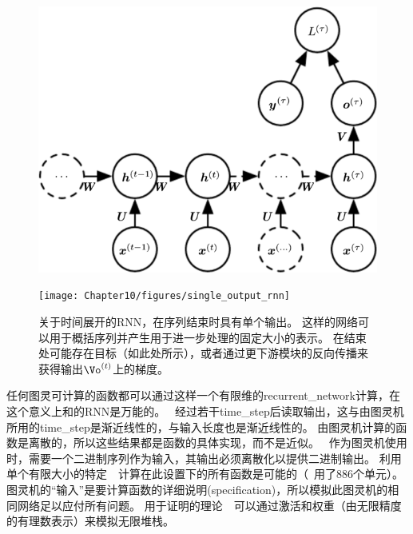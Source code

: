 \begin{figure}[!htb]
\ifOpenSource
\centerline{\includegraphics[scale=0.5]{images/93.png}}
\else
\centerline{\texttt{[image: Chapter10/figures/single\_output\_rnn]}}
\fi
\caption{关于时间展开的\gls{RNN}，在序列结束时具有单个输出。
这样的网络可以用于概括序列并产生用于进一步处理的固定大小的表示。
在结束处可能存在目标（如此处所示），或者通过更下游模块的反向传播来获得输出$\Vo^{(t)}$上的梯度。
}
\label{fig:chap10_single_output_rnn}
\end{figure}

任何图灵可计算的函数都可以通过这样一个有限维的\gls{recurrent_network}计算，在这个意义上和的\gls{RNN}是万能的。
~经过若干\gls{time_step}后读取输出，这与由图灵机所用的\gls{time_step}是渐近线性的，与输入长度也是渐近线性的\citep{Siegelmann+Sontag-1991,Siegelmann-1995,Siegelmann+Sontag-1995,Hyotyniemi-1996}。
由图灵机计算的函数是离散的，所以这些结果都是函数的具体实现，而不是近似。
~作为图灵机使用时，需要一个二进制序列作为输入，其输出必须离散化以提供二进制输出。
利用单个有限大小的特定~~计算在此设置下的所有函数是可能的（~\cite{Siegelmann+Sontag-1995}用了886个单元）。
图灵机的``输入''是要计算函数的详细说明(specification)，所以模拟此图灵机的相同网络足以应付所有问题。
用于证明的理论~~可以通过激活和权重（由无限精度的有理数表示）来模拟无限堆栈。


